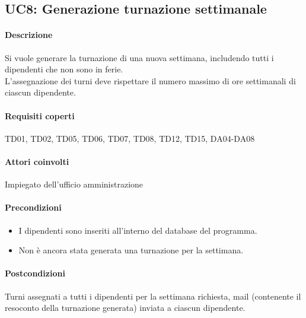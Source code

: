 \subsection{UC8: Generazione turnazione settimanale}
\paragraph{Descrizione}
Si vuole generare la turnazione di una nuova settimana, includendo tutti i dipendenti che non sono in ferie.\\
L'assegnazione dei turni deve rispettare il numero massimo di ore settimanali di ciascun dipendente.
\paragraph{Requisiti coperti}
TD01, TD02, TD05, TD06, TD07, TD08,  TD12, TD15, DA04-DA08
\paragraph{Attori coinvolti}
Impiegato dell'ufficio amministrazione
\paragraph{Precondizioni}
\begin{itemize}
	\item I dipendenti sono inseriti all'interno del database del programma.
	\item Non è ancora stata generata una turnazione per la settimana.
\end{itemize}
\paragraph{Postcondizioni}
Turni assegnati a tutti i dipendenti per la settimana richiesta, mail (contenente il resoconto della turnazione generata) inviata a ciascun dipendente.

